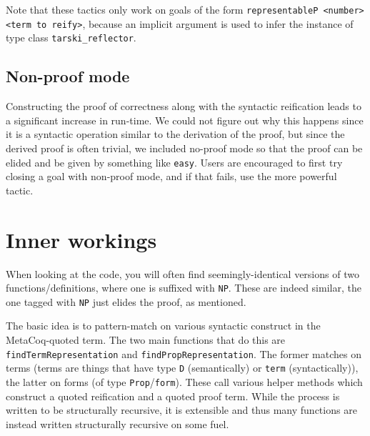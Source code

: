 \documentclass[11pt,a4paper]{article}
\begin{document}
Note that these tactics only work on goals of the form \lstinline|representableP <number> <term to reify>|, because an implicit argument is used to infer the instance of type class \lstinline|tarski_reflector|.

\subsection{Non-proof mode}
Constructing the proof of correctness along with the syntactic reification leads to a significant increase in run-time. We could not figure out why this happens since it is a syntactic operation similar to the derivation of the proof, but since the derived proof is often trivial, we included no-proof mode so that the proof can be elided and be given by something like \lstinline|easy|. Users are encouraged to first try closing a goal with non-proof mode, and if that fails, use the more powerful tactic.
\newpage
\section{Inner workings}
When looking at the code, you will often find seemingly-identical versions of two functions/definitions, where one is suffixed with \lstinline|NP|. These are indeed similar, the one tagged with \lstinline|NP| just elides the proof, as mentioned.

The basic idea is to pattern-match on various syntactic construct in the MetaCoq-quoted term. The two main functions that do this are \lstinline|findTermRepresentation| and \lstinline|findPropRepresentation|. The former matches on terms (terms are things that have type \lstinline|D| (semantically) or \lstinline|term| (syntactically)), the latter on forms (of type \lstinline|Prop|/\lstinline|form|). These call various helper methods which construct a quoted reification and a quoted proof term. While the process is written to be structurally recursive, it is extensible and thus many functions are instead written structurally recursive on some fuel.
\end{document}

